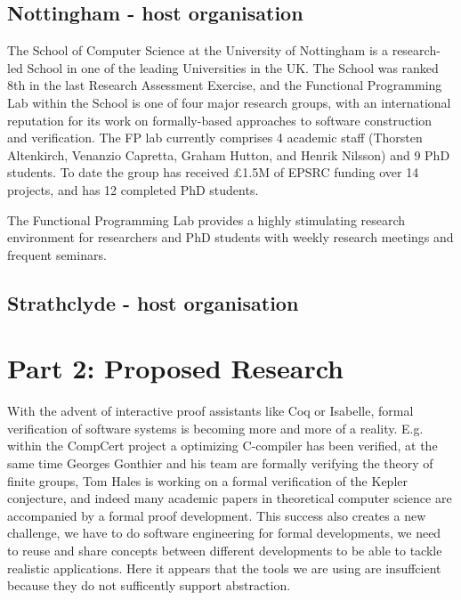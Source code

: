 \documentclass[twocolumn,a4paper,11pt]{article}
\begin{document}
\subsection*{Nottingham - host organisation}

The School of Computer Science at the University of Nottingham
is a research-led School in one of the leading Universities in
the UK. The School was ranked 8th in the last Research Assessment
Exercise, and the Functional Programming Lab within the School is
one of four major research groups, with an international reputation
for its work on formally-based approaches to software construction
and verification.  The FP lab currently comprises 4 academic staff
(Thorsten Altenkirch, Venanzio Capretta, Graham Hutton, and Henrik
Nilsson) and 9 PhD students.  To date the
group has received \pounds 1.5M of EPSRC funding over 14 projects,
and has 12 completed PhD students.

The Functional Programming Lab provides a highly stimulating
research environment for researchers and PhD students with weekly
research meetings and frequent seminars. 

\subsection*{Strathclyde - host organisation}



\newpage

\section*{Part 2: Proposed Research}

With the advent of interactive proof assistants like Coq or Isabelle,
formal verification of software systems is becoming more and more of a
reality. E.g. within the CompCert project a optimizing C-compiler has
been verified, at the same time Georges Gonthier and his team are
formally verifying the theory of finite groups, Tom Hales is
working on a formal verification of the Kepler conjecture, and indeed
many academic papers in theoretical computer science are accompanied
by a formal proof development. This success also creates a new
challenge, we have to do software engineering for formal developments,
we need to reuse and share concepts between different developments to
be able to tackle realistic applications. Here it appears that the
tools we are using are insuffcient because they do not sufficently
support abstraction. 
\end{document}

